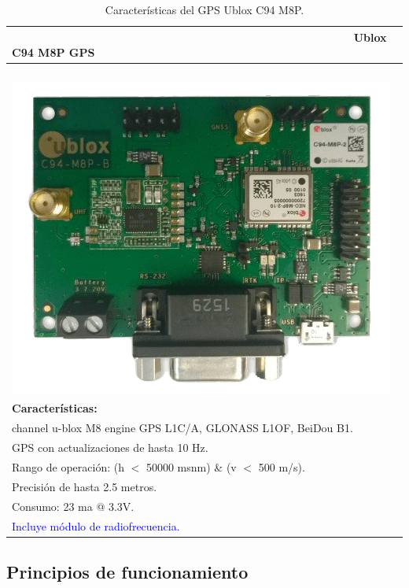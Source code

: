 \begin{table}[!htb]
\begin{center}
\caption{Características del GPS Ublox C94 M8P.}
\begin{tabular}{|l|}
	\hline
	\ \ \ \ \ \ \ \ \ \ \ \ \ \ \ \ \ \ \ \ \ \ \ \ \ \ \ \ \ \ \ \ \ \ \ \ \ \ \ \ \ \ \ \ \ \ \ \ \ \ \ \ \ \ \textbf{Ublox C94 M8P GPS}\\
	\hline
	      \ \ \ \ \ \ \ \ \ \ \ \ \ \ \ \ \ \ \ \ \ \ \ \ \ \ \ \ \ \ \ \ \ \ \ \ \ \ \ \ \includegraphics[width=0.25\linewidth]{Figures/ublox}\footnotemark
	\label{fig:ubx} \\
	\textbf{Características: }\\

		\tabitem 72 channel u-blox M8 engine GPS L1C/A, GLONASS L1OF, BeiDou B1.\\
		\tabitem GPS con actualizaciones de hasta 10 Hz.\\
		\tabitem Rango de operación: (h $<$ 50000 msnm) \& (v $<$ 500 m/s).\\
		\tabitem Precisión de hasta 2.5 metros.\\
		\tabitem Consumo: 23 ma @ 3.3V.\\
		\tabitem \textcolor{blue}{Incluye módulo de radiofrecuencia.}\\
	\hline
\end{tabular}
\end{center}
\end{table}


\FloatBarrier

\newpage

\subsection{Principios de funcionamiento}

